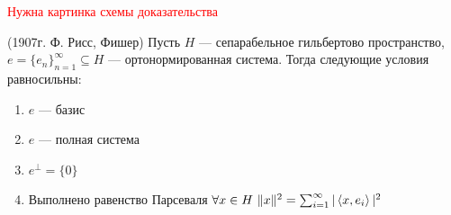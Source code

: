 \textcolor{red}{Нужна картинка схемы доказательства}

\begin{theorem} (1907г. Ф. Рисс, Фишер)
	Пусть $H$ --- сепарабельное гильбертово пространство, $e = \{e_n\}_{n = 1}^\infty \subseteq H$ --- ортонормированная система. Тогда следующие условия равносильны:
	\begin{enumerate}
		\item $e$ --- базис
		
		\item $e$ --- полная система
		
		\item $e^\bot = \{0\}$
		
		\item Выполнено равенство Парсеваля $\forall x \in H\ \|x\|^2 = \sum_{i = 1}^\infty |\left\langle x, e_i\right\rangle|^2$
	\end{enumerate}
\end{theorem}

